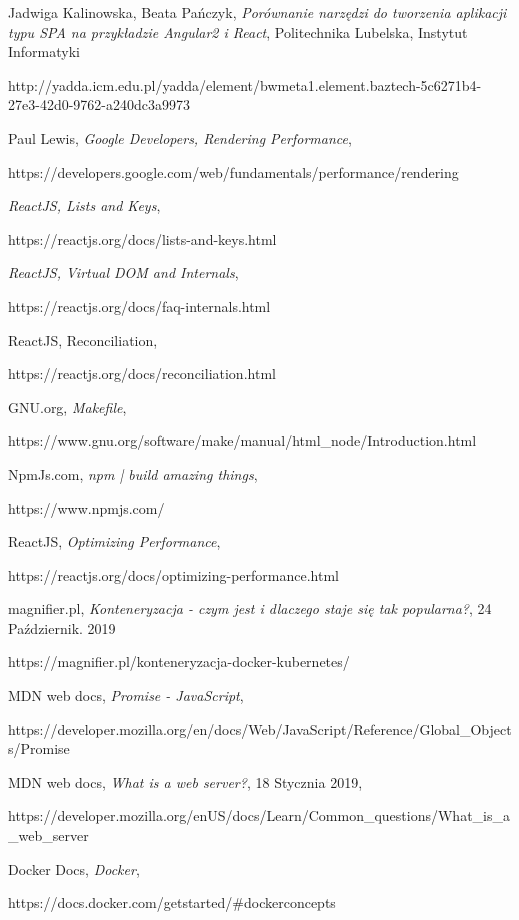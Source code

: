 \begin{thebibliography}{99}
Jadwiga Kalinowska, Beata Pańczyk,
\textit{Porównanie narzędzi do tworzenia aplikacji typu SPA na przykładzie Angular2 i React},
Politechnika Lubelska, Instytut Informatyki

http://yadda.icm.edu.pl/yadda/element/bwmeta1.element.baztech-5c6271b4-27e3-42d0-9762-a240dc3a9973

Paul Lewis,
\textit{Google Developers, Rendering Performance},

https://developers.google.com/web/fundamentals/performance/rendering

\textit{ReactJS,  Lists and Keys},

https://reactjs.org/docs/lists-and-keys.html

\textit{ReactJS, Virtual DOM and Internals}, 

https://reactjs.org/docs/faq-internals.html

ReactJS, Reconciliation,

https://reactjs.org/docs/reconciliation.html

GNU.org, 
\textit{Makefile},

https://www.gnu.org/software/make/manual/html\_node/Introduction.html

NpmJs.com,
\textit{npm | build amazing things},

https://www.npmjs.com/

 ReactJS,
\textit{Optimizing Performance},

https://reactjs.org/docs/optimizing-performance.html

magnifier.pl,
\textit{Konteneryzacja - czym jest i dlaczego staje się tak popularna?},
24 Październik. 2019

https://magnifier.pl/konteneryzacja-docker-kubernetes/

MDN web docs,
\textit{Promise - JavaScript},

https://developer.mozilla.org/en/docs/Web/JavaScript/Reference/Global\_Objects/Promise

MDN web docs,
\textit{What is a web server?},
18 Stycznia 2019,

https://developer.mozilla.org/en\-US/docs/Learn/Common\_questions/What\_is\_a\_web\_server

Docker Docs,
\textit{Docker},

https://docs.docker.com/get\-started/\#docker\-concepts


\end{thebibliography}
